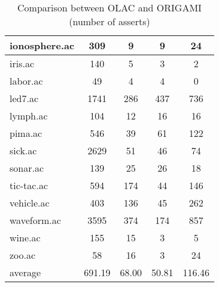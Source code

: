\begin{table}[htbp]
\begin{tabular}{|l|c|c|c|c|}
		\hline
		ionosphere.ac   & 309           & 9                  & 9                        & 24                            \\
		\hline
		iris.ac         & 140           & 5                  & 3                        & 2                             \\
		\hline
		labor.ac        & 49            & 4                  & 4                        & 0                             \\
		\hline
		led7.ac         & 1741          & 286                & 437                      & 736                           \\
		\hline
		lymph.ac        & 104           & 12                 & 16                       & 16                            \\
		\hline
		pima.ac         & 546           & 39                 & 61                       & 122                           \\
		\hline
		sick.ac         & 2629          & 51                 & 46                       & 74                            \\
		\hline
		sonar.ac        & 139           & 25                 & 26                       & 18                            \\
		\hline
		tic-tac.ac      & 594           & 174                & 44                       & 146                           \\
		\hline
		vehicle.ac      & 403           & 136                & 45                       & 262                           \\
		\hline
		waveform.ac     & 3595          & 374                & 174                      & 857                           \\
		\hline
		wine.ac         & 155           & 15                 & 3                        & 5                             \\
		\hline
		zoo.ac          & 58            & 16                 & 3                        & 24                            \\
		\hline
		average         & 691.19        & 68.00              & 50.81                    & 116.46                        \\
		\hline
		\end{tabular}
	\caption{Comparison between OLAC and ORIGAMI (number of asserts)}
	\label{tab:comparison_olac_origami}
\end{table}